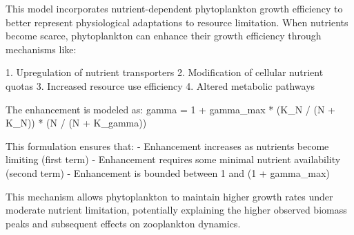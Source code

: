 This model incorporates nutrient-dependent phytoplankton growth efficiency to better represent physiological adaptations to resource limitation. When nutrients become scarce, phytoplankton can enhance their growth efficiency through mechanisms like:

1. Upregulation of nutrient transporters
2. Modification of cellular nutrient quotas
3. Increased resource use efficiency
4. Altered metabolic pathways

The enhancement is modeled as:
gamma = 1 + gamma_max * (K_N / (N + K_N)) * (N / (N + K_gamma))

This formulation ensures that:
- Enhancement increases as nutrients become limiting (first term)
- Enhancement requires some minimal nutrient availability (second term)
- Enhancement is bounded between 1 and (1 + gamma_max)

This mechanism allows phytoplankton to maintain higher growth rates under moderate nutrient limitation, potentially explaining the higher observed biomass peaks and subsequent effects on zooplankton dynamics.
